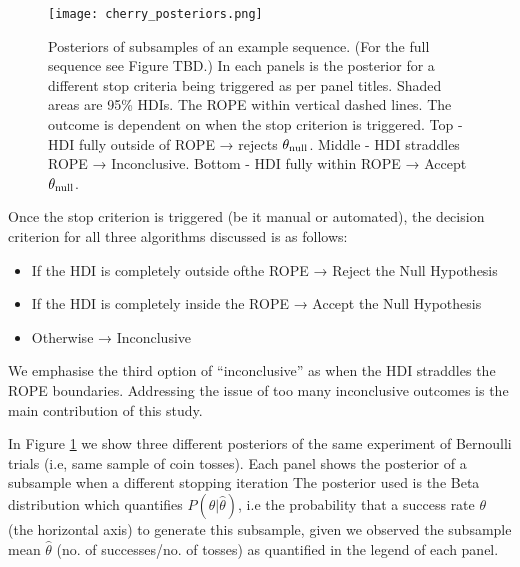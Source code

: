 \begin{figure}[h!]
    \centering
    \texttt{[image: cherry\_posteriors.png]}
    \caption{Posteriors of subsamples of an example sequence. (For the full sequence see Figure TBD.)
    In each panels is the posterior for a different stop criteria being triggered as per panel titles.
    Shaded areas are 95\% HDIs. The ROPE within vertical dashed lines.
    The outcome is dependent on when the stop criterion is triggered.
    Top - HDI fully outside of ROPE → rejects $\theta_{\rm null}$.
    Middle - HDI straddles ROPE → Inconclusive.
    Bottom - HDI fully within ROPE → Accept $\theta_{\rm null}$.
    }
    \label{fig:posteriors}
\end{figure}

Once the stop criterion is triggered (be it manual or automated),
the decision criterion for all three algorithms discussed is as follows:

\begin{itemize}
    \item If the HDI is completely outside ofthe ROPE → Reject the Null Hypothesis
    \item If the HDI is completely inside the ROPE → Accept the Null Hypothesis
    \item Otherwise → Inconclusive
\end{itemize}

We emphasise the third option of “inconclusive” as when the HDI straddles the ROPE
boundaries. Addressing the issue of too many inconclusive outcomes is the main contribution of this study.

In Figure \ref{fig:posteriors} we show three different posteriors of the same experiment of Bernoulli
trials (i.e, same sample of coin tosses). %
Each panel shows the posterior of a subsample when a different stopping iteration
The posterior used is the Beta distribution which quantifies $P(\theta|\hat{\theta})$,
i.e the probability that a
success rate $\theta$ (the horizontal axis) to generate this subsample,
given we observed the subsample mean $\hat\theta$ (no. of successes/no. of tosses)
as quantified in the legend of each panel.

